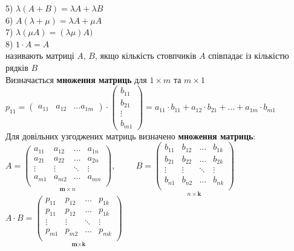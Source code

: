 \documentclass[a4paper, 10pt]{article}
\theoremstyle{theoremdd}
\begin{document}
	5) $\lambda(A+B) = \lambda A + \lambda B$\\
	6) $A (\lambda + \mu) = \lambda A + \mu A$\\
	7) $\lambda (\mu A) = (\lambda \mu) A)$\\
	8) $1 \cdot A = A$
	\bigskip \\
	 називають матриці $A$, $B$, якщо кількість стовпчиків $A$ співпадає із кількістю рядків $B$
	\bigskip \\
	 Визначається \textbf{множення матриць} для $1 \times m$ та $m \times 1$\\
	$p_{11} = \begin{pmatrix}
	a_{11} & a_{12} & \dots a_{1m}
	\end{pmatrix} \cdot \begin{pmatrix}
	b_{11} \\ b_{21} \\ \vdots \\ b_{m1} 
	\end{pmatrix} = a_{11} \cdot b_{11} + a_{12} \cdot b_{21} + \dots + a_{1m} \cdot b_{m1}$
	\bigskip \\
	 Для довільних узгоджених матриць визначено \textbf{множення матриць}:\\
	$A = \underset{\textbf{m} \times n}{\begin{pmatrix}
	a_{11} & a_{12} & \dots & a_{1n} \\
	a_{21} & a_{22} & \dots & a_{2n} \\
	\vdots & \vdots & \ddots & \vdots \\
	a_{m1} & a_{m2} & \dots & a_{mn} \\
	\end{pmatrix}}, \hspace{1cm} B = \underset{n \times \textbf{k}}{\begin{pmatrix}
	b_{11} & b_{12} & \dots & b_{1k} \\
    	b_{21} & b_{22} & \dots & b_{2k} \\
    	\vdots & \vdots & \ddots & \vdots \\
    	b_{n1} & b_{n2} & \dots & b_{nk} \\
	\end{pmatrix}}$\\
	$A \cdot B = \underset{\textbf{m} \times \textbf{k}}{\begin{pmatrix}
	p_{11} & p_{12} & \dots & p_{1k} \\
	p_{11} & p_{12} & \dots & p_{1k} \\
	\vdots & \vdots & \ddots & \vdots \\
	p_{m1} & p_{m2} & \dots & p_{mk} \\
	\end{pmatrix}}$\\
\end{document}
